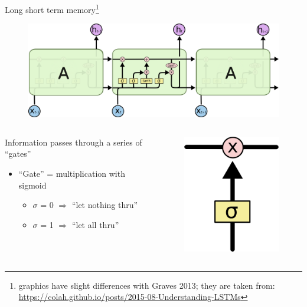 \documentclass[10pt,xcolor=dvipsnames]{beamer}
\begin{document}
\begin{frame}{Long short term memory\footnote{graphics have slight differences
      with Graves 2013; they are taken from: \\
      \url{https://colah.github.io/posts/2015-08-Understanding-LSTMs}} }
 \begin{figure}
   \centering
   \includegraphics[width=\linewidth]{fig/LSTM3-chain.png}
 \end{figure}
\begin{columns}
  \begin{column}{.7\textwidth}
   Information passes through a series of ``gates''
   \begin{itemize}
   \item ``Gate'' = multiplication with sigmoid
     \begin{itemize}
     \item $\sigma$ = 0 $\Rightarrow$ ``let nothing thru''
     \item $\sigma$ = 1 $\Rightarrow$ ``let all thru''
     \end{itemize}
   \end{itemize}
  \end{column}

  \begin{column}{.3\textwidth}
      \begin{figure}
        \includegraphics[width=.4\linewidth]{fig/LSTM3-gate.png}
        \label{fig:gate}
      \end{figure}
  \end{column}
\end{columns}
\end{frame}
\end{document}
